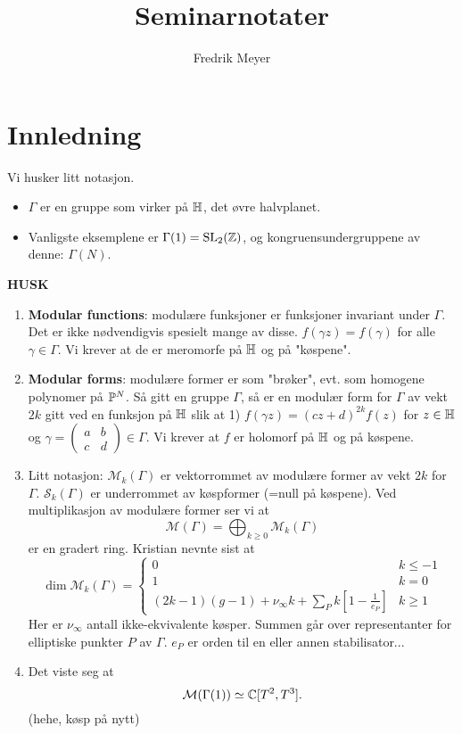 \documentclass[11pt, english]{article}
\begin{document}
\title{Seminarnotater}
\author{Fredrik Meyer}
\maketitle 

\section{Innledning}

Vi husker litt notasjon.
\begin{itemize}
\item $\Gamma$ er en gruppe som virker på $\mathbb{H}$, det øvre halvplanet.
\item Vanligste eksemplene er $\Gamma(1)=\operatorname{SL}_2(\mathbb{Z})$, og kongruensundergruppene av denne: $\Gamma(N)$.
\end{itemize}


\textbf{HUSK}

\begin{enumerate}
\item \textbf{Modular functions}: modulære funksjoner er funksjoner invariant under $\Gamma$. Det er ikke nødvendigvis spesielt mange av disse. $f(\gamma z)=f(\gamma)$ for alle $\gamma \in \Gamma$. Vi krever at de er meromorfe på $\mathbb{H}$ og på "køspene".
\item \textbf{Modular forms}: modulære former er som "brøker", evt. som homogene polynomer på $\mathbb{P}^N$. Så gitt en gruppe $\Gamma$, så er en modulær form for $\Gamma$ av vekt $2k$ gitt ved en funksjon på $\mathbb{H}$ slik at 1) $f(\gamma z)=(cz+d)^{2k}f(z)$ for $z \in \mathbb{H}$ og $\gamma=\begin{pmatrix} a & b \\ c & d \end{pmatrix} \in \Gamma$. Vi krever at $f$ er holomorf på $\mathbb{H}$ og på køspene. 
\item Litt notasjon: $\mathcal M_k(\Gamma)$ er vektorrommet av modulære former av vekt $2k$ for $\Gamma$. $\mathcal S_k(\Gamma)$ er underrommet av køspformer (=null på køspene). Ved multiplikasjon av modulære former ser vi at 
$$
\mathcal M( \Gamma) = \bigoplus_{k \geq 0} \mathcal M_k(\Gamma)
$$
er en gradert ring. Kristian nevnte sist at 
\[
\dim \mathcal M_k(\Gamma) = \begin{cases} 0 & k \leq -1 \\
1 & k = 0 \\
(2k-1)(g-1) + \nu_\infty k + \sum_P k\left[1-\frac{1}{e_P}\right] & k \geq 1
\end{cases}
\]
Her er $\nu_\infty$ antall ikke-ekvivalente køsper. Summen går over representanter for elliptiske punkter $P$ av $\Gamma$. $e_P$ er orden til en eller annen stabilisator... 
\item Det viste seg at
\[
\mathcal M (\Gamma(1)) \simeq \mathbb{C}[T^2,T^3].
\]
(hehe, køsp på nytt)
\end{enumerate}
\end{document}
